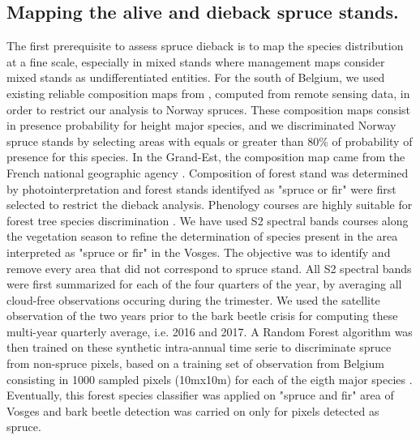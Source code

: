 \documentclass[3p,procedia]{elsarticle}
\begin{document}
\subsection{Mapping the alive and dieback spruce stands.}
The first prerequisite to assess spruce dieback is to map the species distribution at a fine scale, especially in mixed stands where management maps consider mixed stands as undifferentiated entities.
For the south of Belgium, we used existing reliable composition maps from \cite{bolyn_mapping_2022}, computed from remote sensing data, in order to restrict our analysis to Norway spruces. 
These composition maps consist in presence probability for height major species, and we discriminated Norway spruce stands by selecting areas with equals or greater than 80\% of probability of presence for this species.  
In the Grand-Est, the composition map came from the French national geographic agency \citep{IGN_bd_2018}. 
Composition of forest stand was determined by photointerpretation and forest stands identifyed as "spruce or fir" were first selected to restrict the dieback analysis. Phenology courses are highly suitable for forest tree species discrimination \citep{lisein_discrimination_2015,grabska_forest_2019,ma_tree_2021}.
We have used S2 spectral bands courses along the vegetation season to refine the determination of species present in the area interpreted as "spruce or fir" in the Vosges.
The objective was to identify and remove every area that did not correspond to spruce stand.
All S2 spectral bands were first summarized for each of the four quarters of the year, by averaging all cloud-free observations occuring during the trimester.
We used the satellite observation of the two years prior to the bark beetle crisis for computing these multi-year quarterly average, i.e. 2016 and 2017.
A Random Forest algorithm was then trained on these synthetic intra-annual time serie to discriminate spruce from non-spruce pixels, based on a training set of observation from Belgium consisting in 1000 sampled pixels (10mx10m) for each of the eigth major species \citep{bolyn_forest_2018}.
Eventually, this forest species classifier was applied on "spruce and fir" area of Vosges and bark beetle detection was carried on only for pixels detected as spruce.
\end{document}

